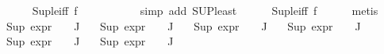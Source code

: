 \begin{isabellebody}
\ \ \ \ \isamarkupfalse%
\ Sup{\isacharunderscore}{\kern0pt}le{\isacharunderscore}{\kern0pt}iff\ f{}\isanewline
\ \ \ \ \ \ \ \ \ \isamarkupfalse%
\ {\isacharparenleft}{\kern0pt}simp\ add{\isacharcolon}{\kern0pt}\ SUP{\isacharunderscore}{\kern0pt}least{\isacharparenright}{\kern0pt}\isanewline
\ \ \ \ \isamarkupfalse%
\ Sup{\isacharunderscore}{\kern0pt}le{\isacharunderscore}{\kern0pt}iff\ f{}\isanewline
\ \ \ \ \isamarkupfalse%
\ {\isacharparenleft}{\kern0pt}metis{\isacharparenright}{\kern0pt}{\isacharplus}{\kern0pt}\isanewline
\isanewline
\ \ \isamarkupfalse%
\ {\isachardoublequoteopen}Sup\ {\isacharparenleft}{\kern0pt}{\isacharparenleft}{\kern0pt}expr{\isacharunderscore}{\kern0pt}{}\ {\isasymcirc}\ {\isasymPhi}{\isacharparenright}{\kern0pt}\ {\isacharbackquote}{\kern0pt}\ J{\isacharparenright}{\kern0pt}\ {\isasymle}\ {}{\isachardoublequoteclose}\isanewline
{}\ {\isachardoublequoteopen}Sup\ {\isacharparenleft}{\kern0pt}{\isacharparenleft}{\kern0pt}expr{\isacharunderscore}{\kern0pt}{}\ {\isasymcirc}\ {\isasymPhi}{\isacharparenright}{\kern0pt}\ {\isacharbackquote}{\kern0pt}\ J{\isacharparenright}{\kern0pt}\ {\isasymle}\ {}{\isachardoublequoteclose}\isanewline
{}\ {\isachardoublequoteopen}Sup\ {\isacharparenleft}{\kern0pt}{\isacharparenleft}{\kern0pt}expr{\isacharunderscore}{\kern0pt}{}\ {\isasymcirc}\ {\isasymPhi}{\isacharparenright}{\kern0pt}\ {\isacharbackquote}{\kern0pt}\ J{\isacharparenright}{\kern0pt}\ {\isasymle}\ {}{\isachardoublequoteclose}\isanewline
{}\ {\isachardoublequoteopen}Sup\ {\isacharparenleft}{\kern0pt}{\isacharparenleft}{\kern0pt}expr{\isacharunderscore}{\kern0pt}{}\ {\isasymcirc}\ {\isasymPhi}{\isacharparenright}{\kern0pt}\ {\isacharbackquote}{\kern0pt}\ J{\isacharparenright}{\kern0pt}\ {\isasymle}\ {}{\isachardoublequoteclose}\isanewline
{}\ {\isachardoublequoteopen}Sup\ {\isacharparenleft}{\kern0pt}{\isacharparenleft}{\kern0pt}expr{\isacharunderscore}{\kern0pt}{}\ {\isasymcirc}\ {\isasymPhi}{\isacharparenright}{\kern0pt}\ {\isacharbackquote}{\kern0pt}\ J{\isacharparenright}{\kern0pt}\ {\isasymle}\ {}{\isachardoublequoteclose}\isanewline
{}\ {\isachardoublequoteopen}Sup\ {\isacharparenleft}{\kern0pt}{\isacharparenleft}{\kern0pt}expr{\isacharunderscore}{\kern0pt}{}\ {\isasymcirc}\ {\isasymPhi}{\isacharparenright}{\kern0pt}\ {\isacharbackquote}{\kern0pt}\ J{\isacharparenright}{\kern0pt}\ {\isasymle}\ {}{\isachardoublequoteclose}\ \isanewline

\end{isabellebody}
